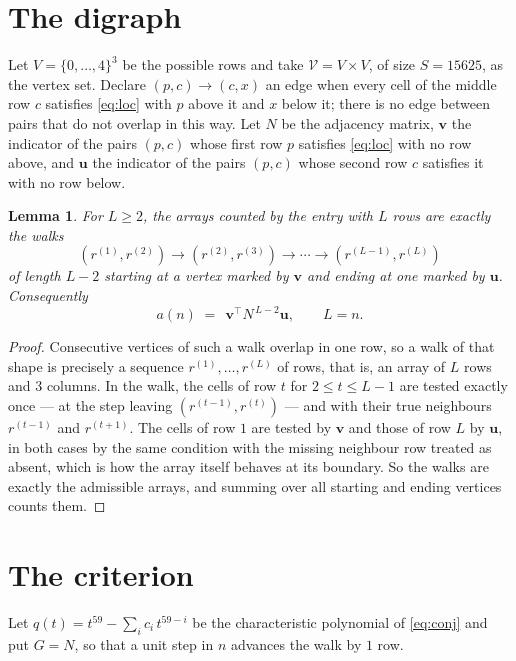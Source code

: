 \documentclass[11pt,a4paper]{article}
\theoremstyle{plain}
\newtheorem{lemma}[theorem]{Lemma}
\theoremstyle{definition}
\begin{document}
\section{The digraph}

Let $V=\{0,\dots,4\}^{3}$ be the possible rows and take
$\mathcal V=V\times V$, of size $S=15625$, as the vertex set. Declare $(p,c)\to(c,x)$ an edge
when every cell of the middle row $c$ satisfies \eqref{eq:loc} with $p$ above it and $x$
below it; there is no edge between pairs that do not overlap in this way. Let $N$ be the
adjacency matrix, $\mathbf{v}$ the indicator of the pairs $(p,c)$ whose first row $p$
satisfies \eqref{eq:loc} with no row above, and $\mathbf{u}$ the indicator of
the pairs $(p,c)$ whose second row $c$ satisfies it with no row below.

\begin{lemma}\label{lem:walk}
For $L\ge2$, the arrays counted by the entry with $L$ rows are exactly the walks
\[
(r^{(1)},r^{(2)})\to(r^{(2)},r^{(3)})\to\cdots\to(r^{(L-1)},r^{(L)})
\]
of length $L-2$ starting at a vertex marked by $\mathbf{v}$ and ending at one marked by
$\mathbf{u}$. Consequently
\[
a(n)\;=\;\,\mathbf{v}^{\!\top}N^{\,L-2}\mathbf{u},\qquad L=n .
\]
\end{lemma}

\begin{proof}
Consecutive vertices of such a walk overlap in one row, so a walk of that shape is
precisely a sequence $r^{(1)},\dots,r^{(L)}$ of rows, that is, an array of $L$ rows
and $3$ columns. In the walk, the cells of row $t$ for $2\le t\le L-1$ are tested
exactly once --- at the step leaving $(r^{(t-1)},r^{(t)})$ --- and with their true
neighbours $r^{(t-1)}$ and $r^{(t+1)}$. The cells of row $1$ are tested by
$\mathbf{v}$ and those of row $L$ by $\mathbf{u}$, in both cases by the same condition
with the missing neighbour row treated as absent, which is how the array itself behaves at
its boundary. So the walks are exactly the admissible arrays, and summing over all starting
and ending vertices counts them.
\end{proof}

\section{The criterion}

Let $q(t)=t^{59}-\sum_i c_i\,t^{59-i}$ be the characteristic polynomial of
\eqref{eq:conj} and put $G=N$, so that a unit step in $n$ advances the walk by
$1$ row.
\end{document}
